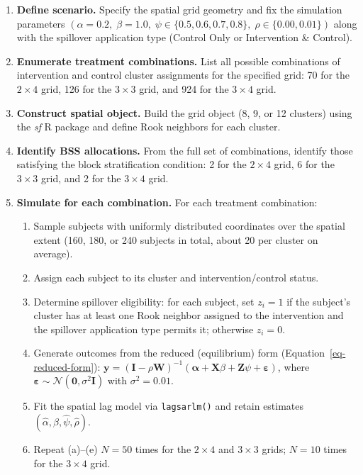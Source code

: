 \documentclass[
  12pt,
  prelim]{bios-prelim}
\begin{document}
\begin{enumerate}
    \item\label{step-define} \textbf{Define scenario.} Specify the spatial grid geometry and fix the simulation parameters $(\alpha = 0.2,\; \beta = 1.0,\; \psi \in \{0.5, 0.6, 0.7, 0.8\},\; \rho \in \{0.00, 0.01\})$ along with the spillover application type (Control Only or Intervention \& Control).

    \item \textbf{Enumerate treatment combinations.} List all possible combinations of intervention and control cluster assignments for the specified grid: 70 for the $2\times4$ grid, 126 for the $3\times3$ grid, and 924 for the $3\times4$ grid.

    \item \textbf{Construct spatial object.} Build the grid object (8, 9, or 12 clusters) using the \textit{sf} R package and define Rook neighbors for each cluster.

    \item \textbf{Identify BSS allocations.} From the full set of combinations, identify those satisfying the block stratification condition: 2 for the $2\times4$ grid, 6 for the $3\times3$ grid, and 2 for the $3\times4$ grid.

    \item\label{step-sim} \textbf{Simulate for each combination.} For each treatment combination:
    \begin{enumerate}
        \item Sample subjects with uniformly distributed coordinates over the spatial extent (160, 180, or 240 subjects in total, about 20 per cluster on average).
        \item Assign each subject to its cluster and intervention/control status.
        \item Determine spillover eligibility: for each subject, set $z_i = 1$ if the subject's cluster has at least one Rook neighbor assigned to the intervention and the spillover application type permits it; otherwise $z_i = 0$.
        \item Generate outcomes from the reduced (equilibrium) form (Equation~\ref{eq-reduced-form}): $\mathbf{y} = (\mathbf{I}-\rho \mathbf{W})^{-1}(\boldsymbol\alpha + \mathbf{X}\beta + \mathbf{Z}\psi + \boldsymbol\varepsilon)$, where $\boldsymbol\varepsilon \sim \mathcal{N}(\mathbf{0}, \sigma^2\mathbf{I})$ with $\sigma^2 = 0.01$.
        \item Fit the spatial lag model via \texttt{lagsarlm()} and retain estimates $(\hat\alpha, \hat\beta, \hat\psi, \hat\rho)$.
        \item Repeat (a)--(e) $N = 50$ times for the $2\times4$ and $3\times3$ grids; $N = 10$ times for the $3\times4$ grid.
    \end{enumerate}


\end{enumerate}
\end{document}
